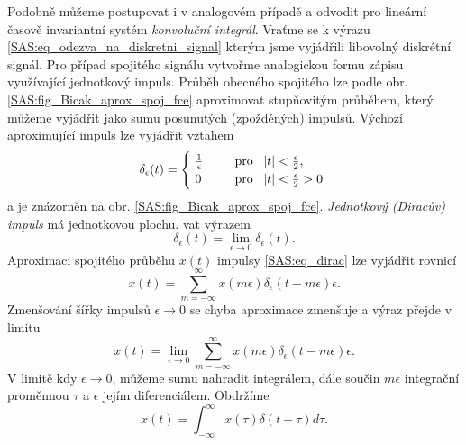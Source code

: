       Podobně můžeme postupovat i v analogovém případě a odvodit pro lineární časově invariantní 
      systém \emph{konvoluční integrál}. Vraťme se k výrazu \ref{SAS:eq_odezva_na_diskretni_signal} 
      kterým jsme vyjádřili libovolný diskrétní signál. Pro případ spojitého signálu vytvořme 
      analogickou formu zápisu využívající jednotkový impuls. Průběh obecného spojitého lze podle 
      obr. \ref{SAS:fig_Bicak_aprox_spoj_fce} aproximovat stupňovitým průběhem, který můžeme 
      vyjádřit jako sumu posunutých (zpožděných) impulsů. Výchozí aproximující impuls lze vyjádřit 
      vztahem
      \begin{equation}\label{SAS:eq_dirac}
          \delta_\epsilon(t)  =
            \begin{cases}
               \frac{1}{\epsilon} & \text{pro } \abs{t} < \frac{\epsilon}{2},      \\
               0                  & \text{pro } \abs{t} < \frac{\epsilon}{2} > 0
            \end{cases}
      \end{equation}
      a je znázorněn na obr. \ref{SAS:fig_Bicak_aprox_spoj_fce}. \emph{Jednotkový (Diracův) impuls} 
      má jednotkovou plochu. vat výrazem
      \begin{equation}\label{SAS:eq_dirac2}
        \delta_\epsilon(t) = \lim_{\epsilon\rightarrow0} \delta_\epsilon(t).
      \end{equation}
      Aproximaci spojitého průběhu $x(t)$ impulsy \ref{SAS:eq_dirac} lze vyjádřit rovnicí
      \begin{equation}\label{SAS:eq_spojit_aprox}
        x(t) = \sum_{m = -\infty}^\infty x(m\epsilon)\delta_\epsilon(t - m\epsilon)\epsilon .
      \end{equation}
      Zmenšování šířky impulsů $\epsilon \rightarrow 0$ se chyba aproximace zmenšuje a výraz přejde v limitu
      \begin{equation}\label{SAS:eq_spojit_aprox2}
        x(t) = \lim_{\epsilon\rightarrow0}
               \sum_{m = -\infty}^\infty x(m\epsilon)\delta_\epsilon(t - m\epsilon)\epsilon .        
      \end{equation}
      V limitě kdy $\epsilon\rightarrow0$, můžeme sumu nahradit integrálem, dále součin $m\epsilon$ 
      integrační proměnnou $\tau$ a $\epsilon$ jejím diferenciálem. Obdržíme
      \begin{equation}\label{SAS:eq_integral_aprox3}
        x(t) = \int_{-\infty}^{\infty}x(\tau)\delta(t-\tau)d\tau .
      \end{equation}
